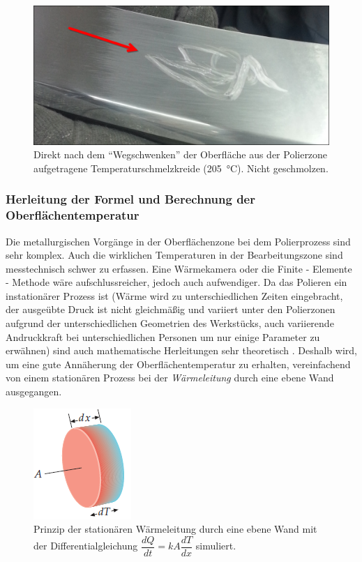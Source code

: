 \documentclass[12pt,a4paper,parskip,twoside,BCOR5mm,headsepline]{scrartcl}
\begin{document}
\begin{figure}[H]
\centering
\includegraphics[width=.8\textwidth]{Kreide}
\caption{Direkt nach dem "`Wegschwenken"' der Oberfläche aus der Polierzone aufgetragene Temperaturschmelzkreide (\SI{205}{\degreeCelsius}). Nicht geschmolzen.}
\label{kreide}
\end{figure}









\subsubsection{Herleitung der Formel und Berechnung der Oberflächentemperatur}
Die metallurgischen Vorgänge in der Oberflächenzone bei dem Polierprozess sind sehr komplex. Auch die wirklichen Temperaturen in der Bearbeitungszone sind messtechnisch schwer zu erfassen. Eine Wärmekamera oder die Finite - Elemente - Methode wäre aufschlussreicher, jedoch auch aufwendiger. Da das Polieren ein instationärer Prozess ist (Wärme wird zu unterschiedlichen Zeiten eingebracht, der ausgeübte Druck ist nicht gleichmäßig und variiert unter den Polierzonen aufgrund der unterschiedlichen Geometrien des Werkstücks, auch variierende Andruckkraft bei unterschiedlichen Personen um nur einige Parameter zu erwähnen) sind auch mathematische Herleitungen sehr theoretisch . Deshalb wird, um eine gute Annäherung der Oberflächentemperatur zu erhalten, vereinfachend von einem stationären Prozess bei der \emph{Wärmeleitung} durch eine ebene Wand ausgegangen.




\begin{figure}[H]
\centering
\includegraphics[width=.4\textwidth]{warmleittip}
\caption{Prinzip der stationären Wärmeleitung durch eine ebene Wand mit der Differentialgleichung $ \dfrac{dQ}{dt} = kA \dfrac{dT}{dx} $ simuliert.\autocite[675]{phtip}}
\label{tipler}
\end{figure}  
\end{document}
